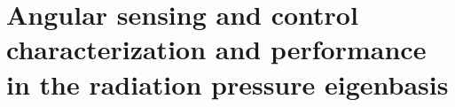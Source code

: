 \chapter{Angular sensing and control characterization and performance in the radiation pressure eigenbasis} 

\label{ch:characterization}











